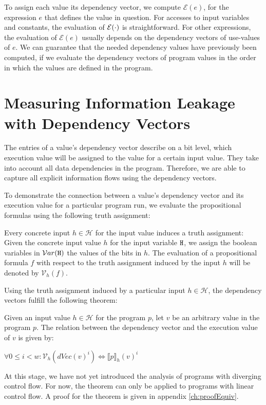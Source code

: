 To assign each value its dependency vector, we compute $\mathcal{E}(e)$, for the expression $e$ that defines the value in question. For accesses to input variables and constants, the evaluation of $\mathcal{E}(\cdot)$ is straightforward. For other expressions, the evaluation of $\mathcal{E}(e)$ usually depends on the dependency vectors of use-values of $e$. We can guarantee that the needed dependency values have previously been computed, if we evaluate the dependency vectors of program values in the order in which the values are defined in the program.

\section{Measuring Information Leakage with Dependency Vectors}\label{sec:leak}

The entries of a value's dependency vector describe on a bit level, which execution value will be assigned to the value for a certain input value. They take into account all data dependencies in the program. Therefore, we are able to capture all explicit information flows using the dependency vectors.

To demonstrate the connection between a value's dependency vector and its execution value for a particular program run, we evaluate the propositional formulas using the following truth assignment:

\begin{definition}\label{def:val}
    Every concrete input $h \in \mathcal{H}$ for the input value \In induces a truth assignment: Given the concrete input value $h$ for the input variable $\mathtt{H}$, we assign the boolean variables in $\mathcal{V}ar(\mathtt{H})$ the values of the bits in $h$.
    The evaluation of a propositional formula $f$ with respect to the truth assignment induced by the input $h$ will be denoted by $\mathcal{V}_h (f)$.
\end{definition}

Using the truth assignment induced by a particular input $h \in \mathcal{H}$, the dependency vectors fulfill the following theorem:

\begin{theorem}\label{thm:equiv}
    Given an input value $h \in \mathcal{H}$ for the program $p$, let $v$ be an arbitrary value in the program $p$. The relation between the dependency vector and the execution value of $v$ is given by:
    \begin{center}
        $\forall 0 \leq i < w: \mathcal{V}_h(dVec(v)^i) \iff \llbracket p \rrbracket_h (v)^i$
    \end{center}
    At this stage, we have not yet introduced the analysis of programs with diverging control flow. For now, the theorem can only be applied to programs with linear control flow. A proof for the theorem is given in appendix \ref{ch:proofEquiv}.
\end{theorem}

